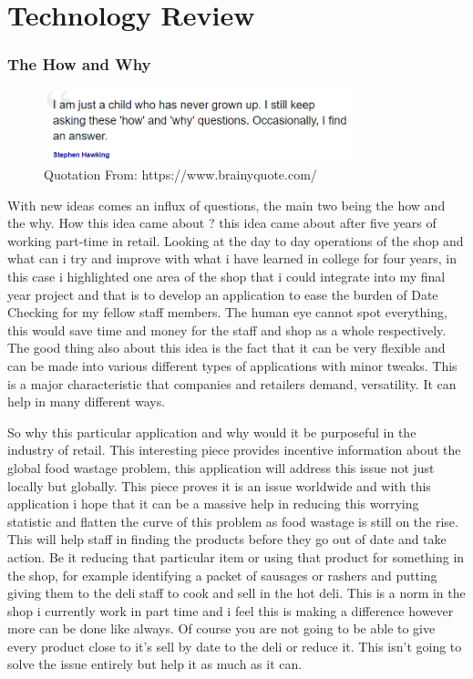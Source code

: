 \chapter{Technology Review}

\subsection{The How and Why}
\begin{figure}[h!]
	\caption{Quotation From: https://www.brainyquote.com/}
	\label{image:quote1}
	\centering
	\includegraphics[width=0.8\textwidth]{images/quote1.PNG}
\end{figure}

With new ideas comes an influx of questions, the main two being the how and the why. How this idea came about ? this idea came about after five years of working part-time in retail. Looking at the day to day operations of the shop and what can i try and improve with what i have learned in college for four years, in this case i highlighted one area of the shop that i could integrate into my final year project and that is to develop an application to ease the burden of Date Checking for my fellow staff members. The human eye cannot spot everything, this would save time and money for the staff and shop as a whole respectively. The good thing also about this idea is the fact that it can be very flexible and can be made into various different types of applications with minor tweaks. This is a major characteristic that companies and retailers demand, versatility. It can help in many different ways.
\newline

So why this particular application and why would it be purposeful in the industry of retail. This interesting piece \cite{gustavsson2011global} provides incentive information about the global food wastage problem, this application will address this issue not just locally but globally. This piece proves it is an issue worldwide and with this application i hope that it can be a massive help in reducing this worrying statistic and flatten the curve of this problem as food wastage is still on the rise. This will help staff in finding the products before they go out of date and take action. Be it reducing that particular item or using that product for something in the shop, for example identifying a packet of sausages or rashers and putting giving them to the deli staff to cook and sell in the hot deli. This is a norm in the shop i currently work in part time and i feel this is making a difference however more can be done like always. Of course you are not going to be able to give every product close to it's sell by date to the deli or reduce it. This isn't going to solve the issue entirely but help it as much as it can. 

